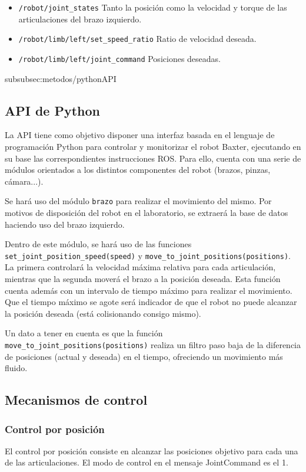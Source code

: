 \begin{itemize}
\item \texttt{/robot/joint\_states} Tanto la posición como la velocidad y torque de las articulaciones del brazo izquierdo.
\item \texttt{/robot/limb/left/set\_speed\_ratio} Ratio de velocidad deseada.
\item \texttt{/robot/limb/left/joint\_command} Posiciones deseadas.
\end{itemize}
subsubsec:metodos/pythonAPI\subsection{API de Python}
\label{subsubsec:metodos/pythonAPI}
La API tiene como objetivo disponer una interfaz basada en el lenguaje de programación Python para controlar y monitorizar el robot Baxter, ejecutando en su base las correspondientes instrucciones ROS. Para ello, cuenta con una serie de módulos orientados a los distintos componentes del robot (brazos, pinzas, cámara...).

Se hará uso del módulo \verb|brazo| para realizar el movimiento del mismo. Por motivos de disposición del robot en el laboratorio, se extraerá la base de datos haciendo uso del brazo izquierdo.

Dentro de este módulo, se hará uso de las funciones \verb|set_joint_position_speed(speed)| y \verb|move_to_joint_positions(positions)|. La primera controlará la velocidad máxima relativa para cada articulación, mientras que la segunda moverá el brazo a la posición deseada. Esta función cuenta además con un intervalo de tiempo máximo para realizar el movimiento. Que el tiempo máximo se agote será indicador de que el robot no puede alcanzar la posición deseada (está colisionando consigo mismo).

Un dato a tener en cuenta es que la función \verb|move_to_joint_positions(positions)| realiza un filtro paso baja de la diferencia de posiciones (actual y deseada) en el tiempo, ofreciendo un movimiento más fluido.
\subsection{Mecanismos de control}
\label{subsec:metodos/control_baxter}
\subsubsection{Control por posición}
El control por posición consiste en alcanzar las posiciones objetivo para cada una de las articulaciones. El modo de control en el mensaje JointCommand es el 1.

